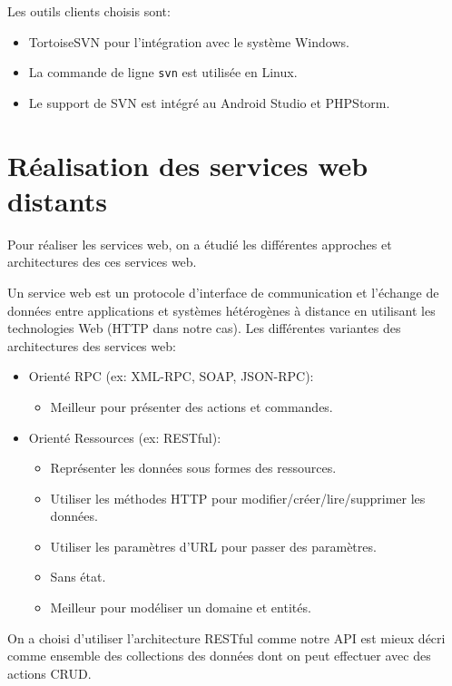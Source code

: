 Les outils clients choisis sont:

\begin{itemize}
    \item TortoiseSVN pour l'intégration avec le système Windows.
    \item La commande de ligne \verb|svn| est utilisée en Linux.
    \item Le support de SVN est intégré au Android Studio et PHPStorm.
\end{itemize}

\section{Réalisation des services web distants}

Pour réaliser les services web, on a étudié les différentes approches et
architectures des ces services web.

Un service web est un protocole d'interface de communication et l'échange de
données entre applications et systèmes hétérogènes à distance en utilisant les
technologies Web (HTTP dans notre cas). Les différentes variantes des
architectures des services web:

\begin{itemize}
    \item Orienté RPC (ex: XML-RPC, SOAP, JSON-RPC):
        \begin{itemize}
            \item Meilleur pour présenter des actions et commandes.
        \end{itemize}
    \item Orienté Ressources (ex: RESTful):
        \begin{itemize}
            \item Représenter les données sous formes des ressources.
            \item Utiliser les méthodes HTTP pour modifier/créer/lire/supprimer
                les données.
            \item Utiliser les paramètres d'URL pour passer des paramètres.
            \item Sans état.
            \item Meilleur pour modéliser un domaine et entités.
        \end{itemize}
\end{itemize}

On a choisi d'utiliser l'architecture RESTful comme notre API est mieux décri
comme ensemble des collections des données dont on peut effectuer avec des
actions CRUD\@.

